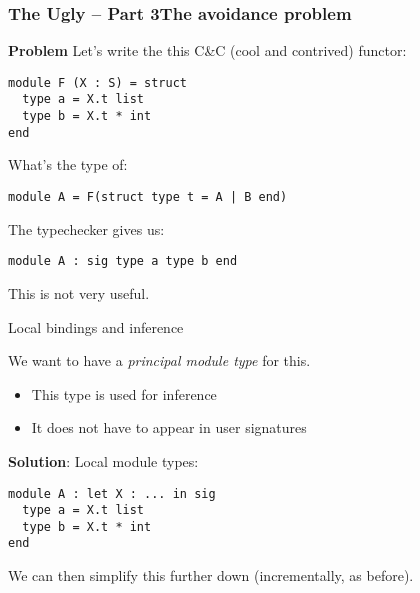 \documentclass[aspectratio=169,dvipsnames,svgnames,10pt]{beamer}
\begin{document}
\appendix

\begin{frame}
  \frametitle{The Ugly -- Part 3\hfill The avoidance problem}

  \textbf{Problem} Let's write the this C\&C (cool and contrived) functor:
\begin{verbatim}
module F (X : S) = struct
  type a = X.t list
  type b = X.t * int
end
\end{verbatim}

  What's the type of:
\begin{verbatim}
module A = F(struct type t = A | B end)
\end{verbatim}
  \pause
  The typechecker gives us:
\begin{verbatim}
module A : sig type a type b end
\end{verbatim}
  This is not very useful. 
\end{frame}

\begin{frame}{Local bindings and inference}

  We want to have a \emph{principal module type} for this.
  \begin{itemize}
  \item This type is used for inference
  \item It does not have to appear in user signatures
  \end{itemize}
  \pause
  
  {\bf Solution}: Local module types:
\begin{verbatim}
module A : let X : ... in sig
  type a = X.t list
  type b = X.t * int
end
\end{verbatim}

  We can then simplify this further down (incrementally, as before).
\end{frame}
\end{document}
